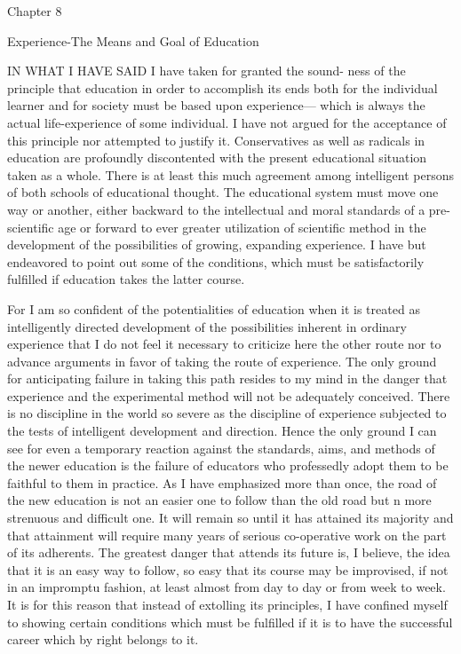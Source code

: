 Chapter 8 

Experience-The Means and Goal of Education 

IN WHAT I HAVE SAID I have taken for granted the sound- ness of the principle 
that education in order to accomplish its ends both for the individual learner and for 
society must be based upon experience— which is always the actual life-experience of 
some individual. I have not argued for the acceptance of this principle nor attempted to 
justify it. Conservatives as well as radicals in education are profoundly discontented with 
the present educational situation taken as a whole. There is at least this much agreement 
among intelligent persons of both schools of educational thought. The educational system 
must move one way or another, either backward to the intellectual and moral standards of 
a pre-scientific age or forward to ever greater utilization of scientific method in the 
development of the possibilities of growing, expanding experience. I have but 
endeavored to point out some of the conditions, which must be satisfactorily fulfilled if 
education takes the latter course. 


For I am so confident of the potentialities of education when it is treated as 
intelligently directed development of the possibilities inherent in ordinary experience that 
I do not feel it necessary to criticize here the other route nor to advance arguments in 
favor of taking the route of experience. The only ground for anticipating failure in taking 
this path resides to my mind in the danger that experience and the experimental method 
will not be adequately conceived. There is no discipline in the world so severe as the 
discipline of experience subjected to the tests of intelligent development and direction. 
Hence the only ground I can see for even a temporary reaction against the standards, 
aims, and methods of the newer education is the failure of educators who professedly 
adopt them to be faithful to them in practice. As I have emphasized more than once, the 
road of the new education is not an easier one to follow than the old road but n more 
strenuous and difficult one. It will remain so until it has attained its majority and that 
attainment will require many years of serious co-operative work on the part of its 
adherents. The greatest danger that attends its future is, I believe, the idea that it is an 
easy way to follow, so easy that its course may be improvised, if not in an impromptu 
fashion, at least almost from day to day or from week to week. It is for this reason that 
instead of extolling its principles, I have confined myself to showing certain conditions 
which must be fulfilled if it is to have the successful career which by right belongs to it. 

